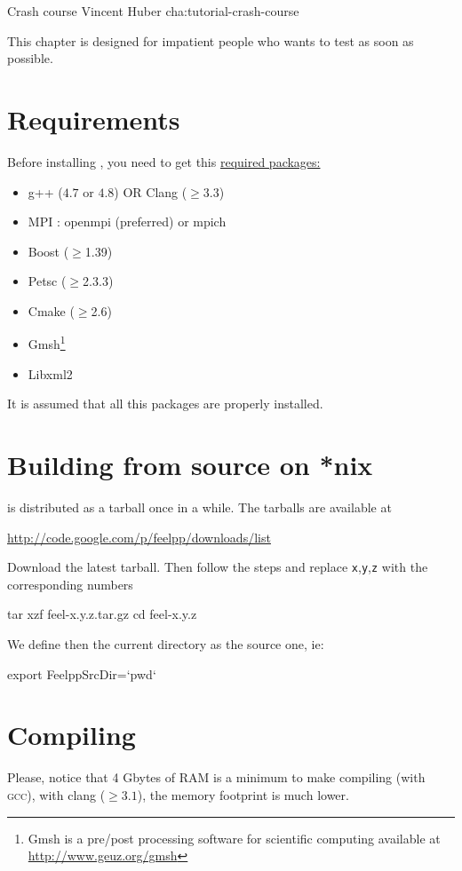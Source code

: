            {Crash course}
            {Vincent Huber}
            {cha:tutorial-crash-course}

This chapter is designed for impatient people who wants to test \feel as soon as possible.
\section{Requirements}
Before installing \feel, you need to get this \underline{required packages:}\\
\begin{itemize}
\item g++ ($4.7$ or $4.8$) OR Clang ($\geq 3.3$)
\item MPI : openmpi (preferred) or mpich
\item Boost ($\geq$1.39)
\item Petsc ($\geq$2.3.3)
\item Cmake ($\geq$2.6)
\item Gmsh\footnote{Gmsh is a pre/post processing software for scientific
computing available at \url{http://www.geuz.org/gmsh}}
\item Libxml2
\end{itemize}
It is assumed that all this packages are properly installed.

\section{Building \feel from source on *nix}
\feel is distributed as a tarball once in a while. The tarballs are available
at
\begin{center}
  \href{http://code.google.com/p/feelpp/downloads/list}{http://code.google.com/p/feelpp/downloads/list}
\end{center}
Download the latest tarball. Then follow the steps and replace
\texttt{x},\texttt{y},\texttt{z} with the corresponding numbers

\begin{unixcom}
  tar xzf feel-x.y.z.tar.gz
  cd feel-x.y.z
\end{unixcom}
We define then the current directory as the source one, ie:
\begin{unixcom}
  export FeelppSrcDir=`pwd`
\end{unixcom}

\section{Compiling}
Please, notice that 4 Gbytes of RAM is a minimum to make \feel compiling (with \textsc{gcc}), with clang ($\geq 3.1$), the memory footprint is much lower.

